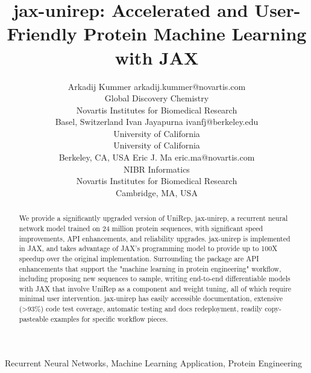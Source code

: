 \documentclass[twoside,11pt]{article}
\begin{document}
\title{jax-unirep: Accelerated and User-Friendly Protein Machine Learning with JAX}

\author{\name Arkadij Kummer \email arkadij.kummer@novartis.com \\
       \addr Global Discovery Chemistry\\
       Novartis Institutes for Biomedical Research\\
       Basel, Switzerland
       \AND
       \name Ivan Jayapurna \email ivanfj@berkeley.edu \\
       \addr University of California\\
       University of California\\
       Berkeley, CA, USA
       \AND
       \name Eric J. Ma \email eric.ma@novartis.com \\
       \addr NIBR Informatics\\
       Novartis Institutes for Biomedical Research\\
       Cambridge, MA, USA
       }


\maketitle

\begin{abstract}%
We provide a significantly upgraded version of UniRep, jax-unirep,
a recurrent neural network model trained on 24 million protein sequences,
with significant speed improvements,
API enhancements,
and reliability upgrades.
jax-unirep is implemented in JAX,
and takes advantage of JAX's programming model
to provide up to 100X speedup over the original implementation.
Surrounding the package are API enhancements
that support the "machine learning in protein engineering" workflow,
including proposing new sequences to sample,
writing end-to-end differentiable models with JAX
that involve UniRep as a component
and weight tuning,
all of which require minimal user intervention.
jax-unirep has easily accessible documentation,
extensive (>93\%) code test coverage,
automatic testing and docs redeployment,
readily copy-pasteable examples for specific workflow pieces.
\end{abstract}

\begin{keywords}
  Recurrent Neural Networks, Machine Learning Application, Protein Engineering
\end{keywords}
\end{document}

